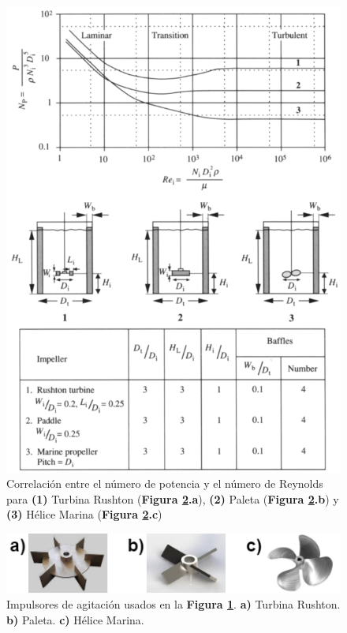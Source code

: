             \begin{figure}
                \centering
                \includegraphics[height=.94\textheight]{img/esquemas/Re_Np.png}
                \caption[Correlación entre el número de potencia y el número de Reynolds]{Correlación entre el número de potencia y el número de Reynolds para \textbf{(1)} Turbina Rushton (\textbf{Figura \ref{fig:resumen_impulsores}.a}), \textbf{(2)} Paleta (\textbf{Figura \ref{fig:resumen_impulsores}.b}) y \textbf{(3)} Hélice Marina (\textbf{Figura \ref{fig:resumen_impulsores}.c}) \cite{doran_bioprocess_2004}}
                \label{fig:Re_Np}
            \end{figure}
            
            \begin{figure}
                \centering
                \includegraphics[width=.5\textwidth]{img/fotos/Resumen Impulsores.png}
                \caption[Impulsores de agitación]{Impulsores de agitación usados en la \textbf{Figura \ref{fig:Re_Np}}. \textbf{a)} Turbina Rushton. \textbf{b)} Paleta. \textbf{c)} Hélice Marina.}
                \label{fig:resumen_impulsores}
            \end{figure}
            
